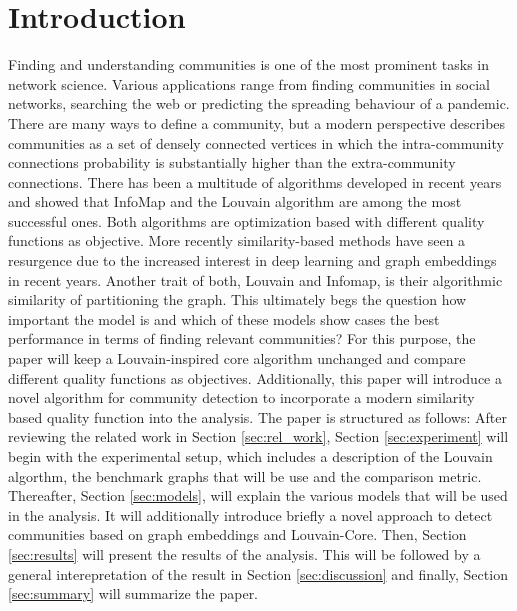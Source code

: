 \documentclass[11pt, twocolumn]{article}
\begin{document}
\section{Introduction}
Finding and understanding communities is one of the most prominent tasks in network science. Various applications range from finding communities in social networks, searching the web or predicting the spreading behaviour of a pandemic. There are many ways to define a community, but a modern perspective describes communities as a set of densely connected vertices in which the intra-community connections probability is substantially higher than the extra-community connections.\cite{fortunato_CommunityDetectionNetworks_2016} There has been a multitude of algorithms developed in recent years and \citeauthor{lancichinetti_CommunityDetectionAlgorithms_2009} showed that InfoMap and the Louvain algorithm are among the most successful ones.\cite{lancichinetti_CommunityDetectionAlgorithms_2009} Both algorithms are optimization based with different quality functions as objective. More recently similarity-based methods have seen a resurgence due to the increased interest in deep learning and graph embeddings in recent years.\cite{liu_DeepLearningCommunity_2020} Another trait of both, Louvain and Infomap, is their algorithmic similarity of partitioning the graph.\cite{rosvall_MapEquation_2009} This ultimately begs the question how important the model is and which of these models show cases the best performance in terms of finding relevant communities? For this purpose, the paper will keep a Louvain-inspired core algorithm unchanged and compare different quality functions as objectives.\cite{blondel_FastUnfoldingCommunities_2008} Additionally, this paper will introduce a novel algorithm for community detection to incorporate a modern similarity based quality function into the analysis. 
The paper is structured as follows: After reviewing the related work in Section \autoref{sec:rel_work}, Section \autoref{sec:experiment} will begin with the experimental setup, which includes a description of the Louvain algorthm, the benchmark graphs that will be use and the comparison metric. Thereafter, Section \autoref{sec:models}, will explain the various models that will be used in the analysis. It will additionally introduce briefly a novel approach to detect communities based on graph embeddings and Louvain-Core. Then, Section \autoref{sec:results} will present the results of the analysis. This will be followed by a general interepretation of the result in Section \autoref{sec:discussion} and finally, Section \autoref{sec:summary} will summarize the paper.
\end{document}
